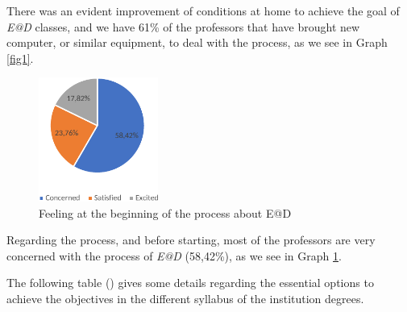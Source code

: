 \documentclass[english]{textolivre}
\begin{document}
There was an evident improvement of conditions at home to achieve the goal of \emph{E@D} classes, and we have 61\% of the professors that have brought new computer, or similar equipment, to deal with the process, as we see in Graph \ref{fig1}.

\begin{figure}[htbp]
 \centering
 \includegraphics[width=0.35\textwidth]{Fig_002.pdf}
 \caption{Feeling at the beginning of the process about E@D}
 \label{fig2}
\end{figure}

Regarding the process, and before starting, most of the professors are very concerned with the process of \emph{E@D} (58,42\%), as we see in Graph \ref{fig2}. 

The following table () gives some details regarding the essential options to achieve the objectives in the different syllabus of the institution degrees.
\end{document}

